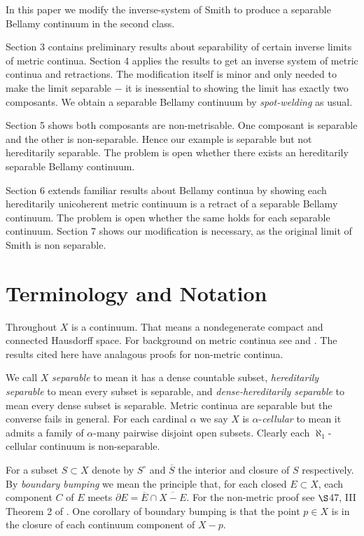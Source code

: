 \documentclass[12pt]{article}
\theoremstyle{plain}
\theoremstyle{definition}
\newcommand{\A}{\ensuremath{\alpha}}
\newcommand{\0}{\ensuremath{\varnothing}}
\newcommand{\DD}{\ensuremath{\partial}}
\begin{document}
	In this paper we modify the inverse-system of Smith \cite{Smith1} to produce a separable Bellamy continuum in the second class.
	
	Section 3 contains preliminary results about separability of certain inverse limits of metric continua.
	Section 4 applies the results to get an inverse system of metric continua and retractions.
	The modification itself is minor and only needed to make the limit separable $-$ it is inessential to showing the limit has exactly two composants.
	We obtain a separable Bellamy continuum by \textit{spot-welding} as usual. 
	
	
	Section 5 shows both composants are non-metrisable.
	One composant is separable and the other is non-separable.
	Hence our example is separable but not hereditarily separable.
	The problem is open whether there exists an hereditarily separable Bellamy continuum. 
	
	
	Section 6 extends familiar results about Bellamy continua by showing 
	each hereditarily unicoherent metric continuum is a retract of a separable Bellamy continuum.
	The problem is open whether the same holds for each separable continuum.
	Section 7 shows our modification is necessary, as the original limit of Smith is non separable.
	
	
	
	\section{Terminology and Notation}
	\noindent
	Throughout $X$ is a continuum. 
	That means a nondegenerate compact and connected Hausdorff space.
	For background on metric continua see \cite{kur2} and \cite{nadlerbook}.
	The results cited here have analagous proofs for non-metric continua.
	
	
	We call $X$ \textit{separable} to mean it has a dense countable subset,
	\textit{hereditarily separable} to mean every subset is separable,
	and \textit{dense-hereditarily separable} to mean every dense subset is separable.
	Metric continua are separable but the converse fails in general.
	For each cardinal $\A$  we say $X$ is $\A$-\textit{cellular} to mean it admits a family of $\A$-many pairwise disjoint open subsets.
	Clearly each $\aleph_1$-cellular continuum is non-separable.
	
	
	For a subset $S \subset X$ denote by $S^\circ$ and $\overline S$ the interior and closure of $S$ respectively. 
	By \textit{boundary bumping} we mean the principle that, for each closed $E \subset X$, each component $C$ of $E$ meets $\DD E = \overline E \cap \overline {X-E}$.
	For the non-metric proof see $\S$47, III Theorem 2 of \cite{kur2}. 
	One corollary of boundary bumping is that the point $p \in X$ is in the closure of each continuum component of $X-p$.
	
\end{document}
